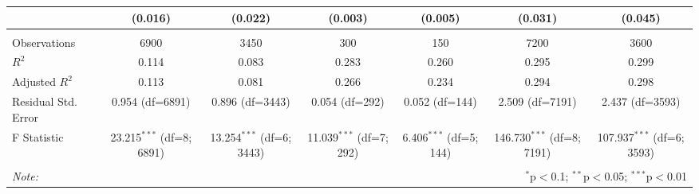\begin{table}[!htbp]
\begin{tabular}{@{\extracolsep{5pt}}lcccccc}
& (0.016) & (0.022) & (0.003) & (0.005) & (0.031) & (0.045) \\
\hline \\[-1.8ex]
 Observations & 6900 & 3450 & 300 & 150 & 7200 & 3600 \\
 $R^2$ & 0.114 & 0.083 & 0.283 & 0.260 & 0.295 & 0.299 \\
 Adjusted $R^2$ & 0.113 & 0.081 & 0.266 & 0.234 & 0.294 & 0.298 \\
 Residual Std. Error & 0.954 (df=6891) & 0.896 (df=3443) & 0.054 (df=292) & 0.052 (df=144) & 2.509 (df=7191) & 2.437 (df=3593) \\
 F Statistic & 23.215$^{***}$ (df=8; 6891) & 13.254$^{***}$ (df=6; 3443) & 11.039$^{***}$ (df=7; 292) & 6.406$^{***}$ (df=5; 144) & 146.730$^{***}$ (df=8; 7191) & 107.937$^{***}$ (df=6; 3593) \\
\hline
\hline \\[-1.8ex]
\textit{Note:} & \multicolumn{6}{r}{$^{*}$p$<$0.1; $^{**}$p$<$0.05; $^{***}$p$<$0.01} \\
\end{tabular}
\end{table}